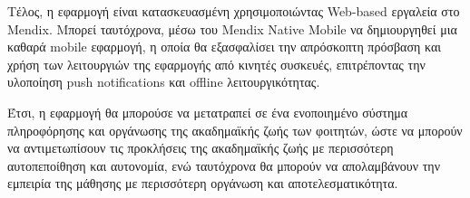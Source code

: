         Τέλος, η εφαρμογή είναι κατασκευασμένη χρησιμοποιώντας Web-based εργαλεία στο Mendix. Μπορεί ταυτόχρονα, μέσω του Mendix Native Mobile να δημιουργηθεί μια καθαρά mobile εφαρμογή, η οποία θα εξασφαλίσει την απρόσκοπτη πρόσβαση και χρήση των λειτουργιών της εφαρμογής από κινητές συσκευές, επιτρέποντας την υλοποίηση push notifications και offline λειτουργικότητας.

        Έτσι, η εφαρμογή θα μπορούσε να μετατραπεί σε ένα ενοποιημένο σύστημα πληροφόρησης και οργάνωσης της ακαδημαϊκής ζωής των φοιτητών, ώστε να μπορούν να αντιμετωπίσουν τις προκλήσεις της ακαδημαϊκής ζωής με περισσότερη αυτοπεποίθηση και αυτονομία, ενώ ταυτόχρονα θα μπορούν να απολαμβάνουν την εμπειρία της μάθησης με περισσότερη οργάνωση και αποτελεσματικότητα.
